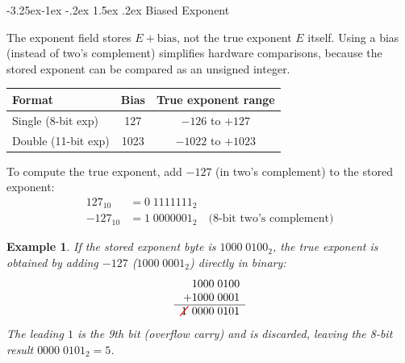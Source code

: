 \documentclass{article}
\makeatletter
\newtheorem{example}{Example}[section]
\theoremstyle{remark}
\newlength{\subsecindent}
\renewcommand\subsection{\@startsection{subsection}{2}{\subsecindent}%
  {-3.25ex\@plus -1ex \@minus -.2ex}%
  {1.5ex \@plus .2ex}%
  {\normalfont\large\bfseries}}
\newenvironment{sub}{%
  \begin{list}{}{%
    \setlength{\leftmargin}{4em}%
    \setlength{\rightmargin}{0pt}%
    \setlength{\topsep}{0pt}%
    \setlength{\partopsep}{0pt}%
    \setlength{\parsep}{\parskip}%
    \setlength{\itemsep}{\parskip}%
  }\item\relax
}{\end{list}}
\makeatother
\begin{document}
\subsection{Biased Exponent}
\begin{sub}
\begin{center}
\end{center}

The exponent field stores $E + \text{bias}$, not the true exponent $E$ itself.
Using a bias (instead of two's complement) simplifies hardware comparisons,
because the stored exponent can be compared as an unsigned integer.

\begin{center}
\begin{tabular}{lcc}
\toprule
Format & Bias & True exponent range \\
\midrule
Single (8-bit exp) & 127 & $-126$ to $+127$ \\
Double (11-bit exp) & 1023 & $-1022$ to $+1023$ \\
\bottomrule
\end{tabular}
\end{center}

To compute the true exponent, add $-127$ (in two's complement) to the stored
exponent:
\begin{align*}
  127_{10}  &= 0\;1111111_2 \\
  -127_{10} &= 1\;0000001_2 \quad \text{(8-bit two's complement)}
\end{align*}

\begin{example}
If the stored exponent byte is $1000\;0100_2$, the true exponent is
obtained by adding $-127$ ($1000\;0001_2$) directly in binary:
\[
  \begin{array}{r}
       1000\;0100 \\
    +  1000\;0001 \\
    \hline
    \tikz[baseline=(X.base)]{\node[inner sep=1pt](X){$1$};\draw[red, thick](X.south west)--(X.north east);}\;0000\;0101
  \end{array}
\]
The leading $1$ is the 9th bit (overflow carry) and is discarded, leaving
the 8-bit result $0000\;0101_2 = 5$.
\end{example}
\end{sub}
\end{document}
